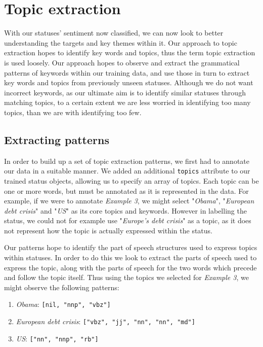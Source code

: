 \chapter{Topic extraction}
\label{topic}

With our statuses' sentiment now classified, we can now look to better understanding the targets and key themes within it. Our approach to topic extraction hopes to identify key words and topics, thus the term topic extraction is used loosely. Our approach hopes to observe and extract the grammatical patterns of keywords within our training data, and use those in turn to extract key words and topics from previously unseen statuses. Although we do not want incorrect keywords, as our ultimate aim is to identify similar statuses through matching topics, to a certain extent we are less worried in identifying too many topics, than we are with identifying too few.

\section{Extracting patterns}

In order to build up a set of topic extraction patterns, we first had to annotate our data in a suitable manner. We added an additional \texttt{topics} attribute to our trained status objects, allowing us to specify an array of topics. Each topic can be one or more words, but must be annotated as it is represented in the data. For example, if we were to annotate \emph{Example 3}, we might select "\emph{Obama}", "\emph{European debt crisis}" and "\emph{US}" as its core topics and keywords. However in labelling the status, we could not for example use "\emph{Europe's debt crisis}" as a topic, as it does not represent how the topic is actually expressed within the status.

Our patterns hope to identify the part of speech structures used to express topics within statuses. In order to do this we look to extract the parts of speech used to express the topic, along with the parts of speech for the two words which precede and follow the topic itself. Thus using the topics we selected for \emph{Example 3}, we might observe the following patterns:

\begin{enumerate}
	\item \emph{Obama}: \texttt{[nil, "nnp", "vbz"]}
	\item \emph{European debt crisis}: \texttt{["vbz", "jj", "nn", "nn", "md"]}
	\item \emph{US}: \texttt{["nn", "nnp", "rb"]}
\end{enumerate}

